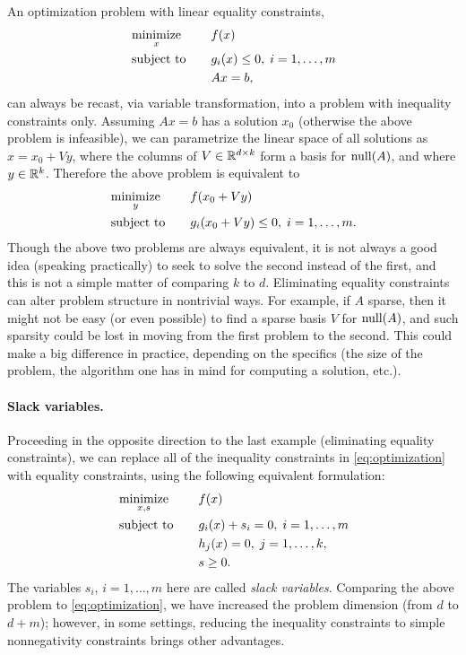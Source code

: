 \begin{Example}
An optimization problem with linear equality constraints,
\begin{alignat*}{2}
&\operatorname*{minimize}_x \quad && f(x) \\
&\operatorname{subject\,\,to} \quad && g_i(x) \leq 0, \; i=1,\dots,m \\ 
& && Ax = b, 
\end{alignat*}
can always be recast, via variable transformation, into a problem with
inequality constraints only. Assuming $Ax = b$ has a solution $x_0$ (otherwise
the above problem is infeasible), we can parametrize the linear space of all 
solutions as $x = x_0 + Vy$, where the columns of $V \in \mathbb{R}^{d \times k}$ form
a basis for $\operatorname{null}(A)$, and where $y \in \mathbb{R}^k$. Therefore the above problem is
equivalent to 
\begin{alignat*}{2}
&\operatorname*{minimize}_y \quad && f(x_0+Vy) \\
&\operatorname{subject\,\,to} \quad && g_i(x_0+Vy) \leq 0, \; i=1,\dots,m.
\end{alignat*}
Though the above two problems are always equivalent, it is not always a good
idea (speaking practically) to seek to solve the second instead of the
first, and this is not a simple matter of comparing $k$ to $d$. Eliminating 
equality constraints can alter problem structure in nontrivial ways. For
example, if $A$ sparse, then it might not be easy (or even possible) to find a
sparse basis $V$ for $\operatorname{null}(A)$, and such sparsity could be lost in moving
from the first problem to the second. This could make a big difference in
practice, depending on the specifics (the size of the problem, the algorithm 
one has in mind for computing a solution, etc.).
\end{Example}

\paragraph{Slack variables.} 

Proceeding in the opposite direction to the last example (eliminating equality
constraints), we can replace all of the inequality constraints in
\eqref{eq:optimization} with equality constraints, using the following
equivalent formulation:  
\begin{alignat*}{2}
&\operatorname*{minimize}_{x,s} \quad && f(x) \\
&\operatorname{subject\,\,to} \quad && g_i(x) + s_i = 0, \; i=1,\dots,m \\ 
& && h_j(x) = 0, \; j=1,\dots,k, \\
& && s \geq 0.
\end{alignat*}
The variables $s_i$, $i=1,\dots,m$ here are called \emph{slack variables}. 
Comparing the above problem to \eqref{eq:optimization}, we have increased the
problem dimension (from $d$ to $d+m$); however, in some settings, reducing the
inequality constraints to simple nonnegativity constraints brings other
advantages.

